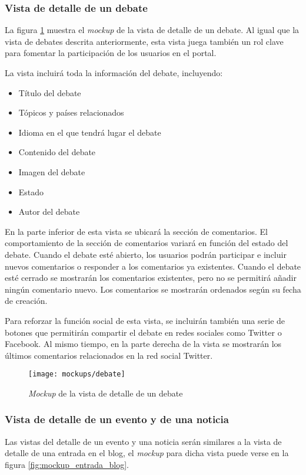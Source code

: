 \subsubsection{Vista de detalle de un debate}
La figura \ref{fig:mockup_debate} muestra el \textit{mockup} de la vista de detalle de un debate.  Al igual que la vista de debates descrita anteriormente, esta vista juega también un rol clave para fomentar la participación de los usuarios en el portal.

La vista incluirá toda la información del debate, incluyendo:
\begin{itemize}
	\item Título del debate
	\item Tópicos y países relacionados
	\item Idioma en el que tendrá lugar el debate
	\item Contenido del debate
	\item Imagen del debate
	\item Estado
	\item Autor del debate
\end{itemize}

En la parte inferior de esta vista se ubicará la sección de comentarios.  El comportamiento de la sección de comentarios variará en función del estado del debate.  Cuando el debate esté abierto, los usuarios podrán participar e incluir nuevos comentarios o  responder a los comentarios ya existentes.  Cuando el debate esté cerrado se mostrarán los comentarios existentes, pero no se permitirá añadir ningún comentario nuevo.  Los comentarios se mostrarán ordenados según su fecha de creación.

Para reforzar la función social de esta vista, se incluirán también una serie de botones que permitirán compartir el debate en redes sociales como Twitter o Facebook.  Al mismo tiempo, en la parte derecha de la vista se mostrarán los últimos comentarios relacionados en la red social Twitter.

\begin{figure}[h]
	\centering
	\texttt{[image: mockups/debate]}
	\caption{\textit{Mockup} de la vista de detalle de un debate}
	\label{fig:mockup_debate}
\end{figure}


\subsubsection{Vista de detalle de un evento y de una noticia}
Las vistas del detalle de un evento y una noticia serán similares a la vista de detalle de una entrada en el blog, el \textit{mockup} para dicha vista puede verse en la figura \ref{fig:mockup_entrada_blog}.

